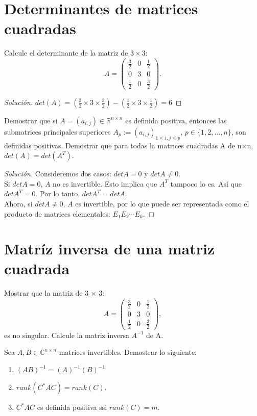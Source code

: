\documentclass[12pt]{book}
\newcommand{\C}{\mathbb{C}}
\newcommand{\R}{\mathbb{R}}
\newenvironment{solution}
  {\renewcommand\qedsymbol{$\square$}\begin{proof}[Solución]}
  {\end{proof}}
\begin{document}
\section{Determinantes de matrices cuadradas}
\exercise Calcule el determinante de la matriz de $3\times3$:
\[
A=\begin{pmatrix}
\frac{3}{2} & 0 & \frac{1}{2}\\
0 & 3 & 0\\
\frac{1}{2} & 0 & \frac{3}{2}
\end{pmatrix}.
\]
\begin{solution}
$det(A) = ( \frac{3}{2}\times3\times\frac{3}{2})-(\frac{1}{2}\times3\times\frac{1}{2})= 6$
\end{solution}
\exercise Demostrar que si $A=(a_{i,j})\in \R^{n\times n}$ es definida positiva, entonces las submatrices principales superiores $A_p := (a_{i,j})_{1\leq i, j\leq p}$, $p\in\{1,2,...,n\}$, son definidas positivas.
\exercise Demostrar que para todas la matrices cuadradas A de n$\times$n, $det(A)=det(A^T)$.
\begin{solution}
Consideremos dos casos: $detA=0$ y $detA\neq0$.\\
Si $detA=0$, $A$ no es invertible. Esto implica que $A^T$ tampoco lo es. Así que $detA^T=0$. Por lo tanto, $detA^T=detA$.\\
Ahora, si $detA\neq0$, $A$ es invertible, por lo que puede ser representada como el producto de matrices elementales: $E_1E_2\cdots E_k$. 
\end{solution}
\section{Matríz inversa de una matriz cuadrada}
\exercise Mostrar que la matriz de 3 $\times$ 3: 
\[
A=\begin{pmatrix}
\frac{3}{2} & 0 & \frac{1}{2}\\
0 & 3 & 0\\
\frac{1}{2} & 0 & \frac{3}{2}
\end{pmatrix},
\]
es no singular. Calcule la matriz inversa $A^{-1}$ de A.

\exercise Sea $A, B\in\C^{n\times n}$ matrices invertibles. Demostrar lo siguiente:
\renewcommand{\labelenumi}{(\alph{enumi})}
\begin{enumerate}
    \item $(AB)^{-1}=(A)^{-1}(B)^{-1}$
    \item $rank(C^*AC)= rank(C)$.
    \item $C^*AC$ es definida positiva ssi $rank(C)=m$.
\end{enumerate}
\end{document}
